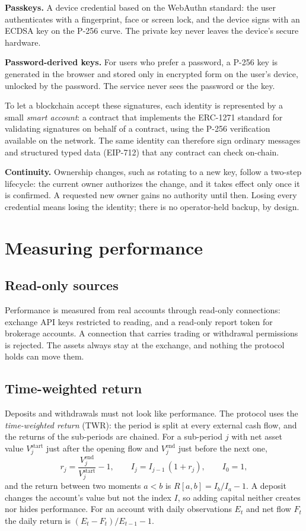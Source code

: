 \documentclass[11pt,a4paper]{article}
\newcommand{\term}[1]{\textit{#1}}
\begin{document}
\textbf{Passkeys.} A device credential based on the WebAuthn standard: the user authenticates with a fingerprint, face or screen lock, and the device signs with an ECDSA key on the P-256 curve. The private key never leaves the device's secure hardware.

\textbf{Password-derived keys.} For users who prefer a password, a P-256 key is generated in the browser and stored only in encrypted form on the user's device, unlocked by the password. The service never sees the password or the key.

To let a blockchain accept these signatures, each identity is represented by a small \term{smart account}: a contract that implements the ERC-1271 standard for validating signatures on behalf of a contract, using the P-256 verification available on the network. The same identity can therefore sign ordinary messages and structured typed data (EIP-712) that any contract can check on-chain.

\textbf{Continuity.} Ownership changes, such as rotating to a new key, follow a two-step lifecycle: the current owner authorizes the change, and it takes effect only once it is confirmed. A requested new owner gains no authority until then. Losing every credential means losing the identity; there is no operator-held backup, by design.

\section{Measuring performance}\label{sec:measure}
\subsection{Read-only sources}
Performance is measured from real accounts through read-only connections: exchange API keys restricted to reading, and a read-only report token for brokerage accounts. A connection that carries trading or withdrawal permissions is rejected. The assets always stay at the exchange, and nothing the protocol holds can move them.

\subsection{Time-weighted return}
Deposits and withdrawals must not look like performance. The protocol uses the \term{time-weighted return} (TWR): the period is split at every external cash flow, and the returns of the sub-periods are chained. For a sub-period $j$ with net asset value $V^{\text{start}}_j$ just after the opening flow and $V^{\text{end}}_j$ just before the next one,
\begin{equation}
  r_j = \frac{V^{\text{end}}_j}{V^{\text{start}}_j} - 1,\qquad
  I_j = I_{j-1}\,(1+r_j),\qquad I_0 = 1,
\end{equation}
and the return between two moments $a<b$ is $R[a,b] = I_b/I_a - 1$. A deposit changes the account's value but not the index $I$, so adding capital neither creates nor hides performance. For an account with daily observations $E_t$ and net flow $F_t$ the daily return is $(E_t - F_t)/E_{t-1} - 1$.
\end{document}
